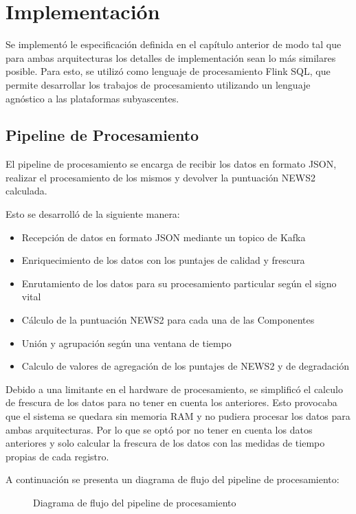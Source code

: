 \section{Implementación}

Se implementó le especificación definida en el capítulo anterior de modo tal que para ambas arquitecturas los detalles de implementación sean lo más similares posible.
Para esto, se utilizó como lenguaje de procesamiento Flink SQL, que permite desarrollar los trabajos de procesamiento utilizando un lenguaje agnóstico a las plataformas subyascentes. 

\subsection{Pipeline de Procesamiento}
El pipeline de procesamiento se encarga de recibir los datos en formato JSON,
realizar el procesamiento de los mismos y devolver la puntuación NEWS2 calculada.

Esto se desarrolló de la siguiente manera:
\begin{itemize}
    \item Recepción de datos en formato JSON mediante un topico de Kafka
    \item Enriquecimiento de los datos con los puntajes de calidad y frescura
    \item Enrutamiento de los datos para su procesamiento particular según el signo vital
    \item Cálculo de la puntuación NEWS2 para cada una de las Componentes
    \item Unión y agrupación según una ventana de tiempo
    \item Calculo de valores de agregación de los puntajes de NEWS2 y de degradación
\end{itemize}

Debido a una limitante en el hardware de procesamiento, se simplificó el calculo de frescura de los datos para no tener en cuenta los anteriores. 
Esto provocaba que el sistema se quedara sin memoria RAM y no pudiera procesar los datos para ambas arquitecturas. 
Por lo que se optó por no tener en cuenta los datos anteriores y solo calcular la frescura de los datos con las medidas de tiempo propias de cada registro.

A continuación se presenta un diagrama de flujo del pipeline de procesamiento:
\begin{figure}[h]
    \caption{Diagrama de flujo del pipeline de procesamiento}
    \label{fig:flowchart}
\end{figure}

